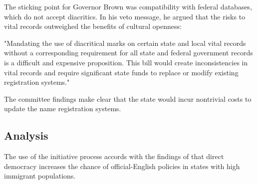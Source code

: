 The sticking point for Governor Brown was compatibility with federal databases,
which do not accept diacritics. In his veto message, he argued that the risks to
vital records outweighed the benefits of cultural openness:

"Mandating the use of diacritical marks on certain state and local vital records
without a corresponding requirement for all state and federal government records
is a difficult and expensive proposition. This bill would create inconsistencies
in vital records and require significant state funds to replace or modify
existing registration systems."

The committee findings make clear that the state would incur nontrivial costs to
update the name registration systems.

\subsection{Analysis}

The use of the initiative process accords with the findings of \textcite{liu14}
that direct democracy increases the chance of official-English policies in
states with high immigrant populations.
